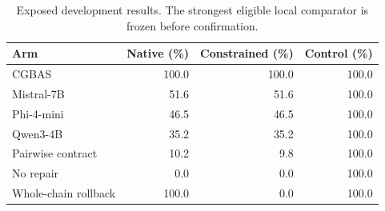 \begin{table}[t]
\centering
\small
\caption{Exposed development results. The strongest eligible local comparator is frozen before confirmation.}
\begin{tabular}{lrrr}
\toprule
Arm & Native (\%) & Constrained (\%) & Control (\%) \\
\midrule
CGBAS & 100.0 & 100.0 & 100.0 \\
Mistral-7B & 51.6 & 51.6 & 100.0 \\
Phi-4-mini & 46.5 & 46.5 & 100.0 \\
Qwen3-4B & 35.2 & 35.2 & 100.0 \\
Pairwise contract & 10.2 & 9.8 & 100.0 \\
No repair & 0.0 & 0.0 & 100.0 \\
Whole-chain rollback & 100.0 & 0.0 & 100.0 \\
\bottomrule
\end{tabular}
\end{table}

